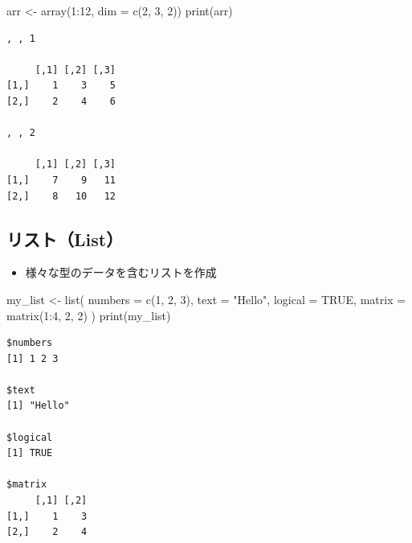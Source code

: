 \documentclass[
  a4paper,
]{ltjsbook}
\newenvironment{Shaded}{\begin{snugshade}}{\end{snugshade}}
\newcommand{\AttributeTok}[1]{\textcolor[rgb]{0.40,0.45,0.13}{#1}}
\newcommand{\ConstantTok}[1]{\textcolor[rgb]{0.56,0.35,0.01}{#1}}
\newcommand{\DecValTok}[1]{\textcolor[rgb]{0.68,0.00,0.00}{#1}}
\newcommand{\FunctionTok}[1]{\textcolor[rgb]{0.28,0.35,0.67}{#1}}
\newcommand{\NormalTok}[1]{\textcolor[rgb]{0.00,0.23,0.31}{#1}}
\newcommand{\OtherTok}[1]{\textcolor[rgb]{0.00,0.23,0.31}{#1}}
\newcommand{\SpecialCharTok}[1]{\textcolor[rgb]{0.37,0.37,0.37}{#1}}
\newcommand{\StringTok}[1]{\textcolor[rgb]{0.13,0.47,0.30}{#1}}
\providecommand{\tightlist}{%
  \setlength{\itemsep}{0pt}\setlength{\parskip}{0pt}}\usepackage{longtable,booktabs,array}
\begin{document}
\begin{Shaded}
\begin{Highlighting}[]
\NormalTok{arr }\OtherTok{\textless{}{-}} \FunctionTok{array}\NormalTok{(}\DecValTok{1}\SpecialCharTok{:}\DecValTok{12}\NormalTok{, }\AttributeTok{dim =} \FunctionTok{c}\NormalTok{(}\DecValTok{2}\NormalTok{, }\DecValTok{3}\NormalTok{, }\DecValTok{2}\NormalTok{))}
\FunctionTok{print}\NormalTok{(arr)}
\end{Highlighting}
\end{Shaded}

\begin{verbatim}
, , 1

     [,1] [,2] [,3]
[1,]    1    3    5
[2,]    2    4    6

, , 2

     [,1] [,2] [,3]
[1,]    7    9   11
[2,]    8   10   12
\end{verbatim}

\subsection{リスト（List）}\label{ux30eaux30b9ux30c8list}

\begin{itemize}
\tightlist
\item
  様々な型のデータを含むリストを作成
\end{itemize}

\begin{Shaded}
\begin{Highlighting}[]
\NormalTok{my\_list }\OtherTok{\textless{}{-}} \FunctionTok{list}\NormalTok{(}
    \AttributeTok{numbers =} \FunctionTok{c}\NormalTok{(}\DecValTok{1}\NormalTok{, }\DecValTok{2}\NormalTok{, }\DecValTok{3}\NormalTok{),}
    \AttributeTok{text =} \StringTok{"Hello"}\NormalTok{,}
    \AttributeTok{logical =} \ConstantTok{TRUE}\NormalTok{,}
    \AttributeTok{matrix =} \FunctionTok{matrix}\NormalTok{(}\DecValTok{1}\SpecialCharTok{:}\DecValTok{4}\NormalTok{, }\DecValTok{2}\NormalTok{, }\DecValTok{2}\NormalTok{)}
\NormalTok{)}
\FunctionTok{print}\NormalTok{(my\_list)}
\end{Highlighting}
\end{Shaded}

\begin{verbatim}
$numbers
[1] 1 2 3

$text
[1] "Hello"

$logical
[1] TRUE

$matrix
     [,1] [,2]
[1,]    1    3
[2,]    2    4
\end{verbatim}
\end{document}

